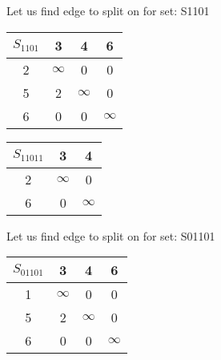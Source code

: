 \documentclass[a4paper,10pt]{report} %
\begin{document}
\newpage





Let us find edge to split on for set: S1101\\
\begin{flushleft}\begin{tabular}[]{|c|c|c|c|}
\hline
$S_{1101 }$& 3 & 4 & 6\\
\hline
2 & $\infty$ &      0 &      0\\
\hline
5 &      2 & $\infty$ &      0\\
\hline
6 &      0 &      0 & $\infty$\\
\hline
\end{tabular}
\end{flushleft}


\begin{table}[ht]
\hfill
{}
\end{table}


\begin{tabular}[]{|c|c|c|}
\hline
$S_{11011 }$& 3 & 4\\
\hline
2 & $\infty$ &      0\\
\hline
6 &      0 & $\infty$\\
\hline
\end{tabular}
\newpage




Let us find edge to split on for set: S01101\\
\begin{flushleft}\begin{tabular}[]{|c|c|c|c|}
\hline
$S_{01101 }$& 3 & 4 & 6\\
\hline
1 & $\infty$ &      0 &      0\\
\hline
5 &      2 & $\infty$ &      0\\
\hline
6 &      0 &      0 & $\infty$\\
\hline
\end{tabular}
\end{flushleft}
\end{document}
